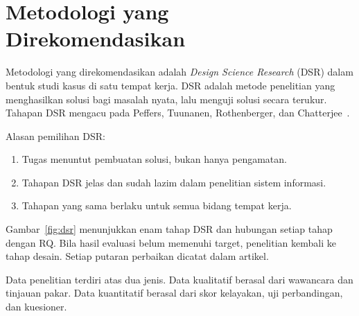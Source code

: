 \documentclass[11pt, a4paper]{article}
\newcommand{\eng}[1]{\textit{#1}}
\begin{document}
\section{Metodologi yang Direkomendasikan}

Metodologi yang direkomendasikan adalah \eng{Design Science Research} (DSR) dalam bentuk studi kasus di satu tempat kerja.
DSR adalah metode penelitian yang menghasilkan solusi bagi masalah nyata, lalu menguji solusi secara terukur.
Tahapan DSR mengacu pada Peffers, Tuunanen, Rothenberger, dan Chatterjee~\cite{peffers2007}.

Alasan pemilihan DSR:
\begin{enumerate}
  \item Tugas menuntut pembuatan solusi, bukan hanya pengamatan.
  \item Tahapan DSR jelas dan sudah lazim dalam penelitian sistem informasi.
  \item Tahapan yang sama berlaku untuk semua bidang tempat kerja.
\end{enumerate}

Gambar~\ref{fig:dsr} menunjukkan enam tahap DSR dan hubungan setiap tahap dengan RQ.
Bila hasil evaluasi belum memenuhi target, penelitian kembali ke tahap desain.
Setiap putaran perbaikan dicatat dalam artikel.

Data penelitian terdiri atas dua jenis.
Data kualitatif berasal dari wawancara dan tinjauan pakar.
Data kuantitatif berasal dari skor kelayakan, uji perbandingan, dan kuesioner.
\end{document}
